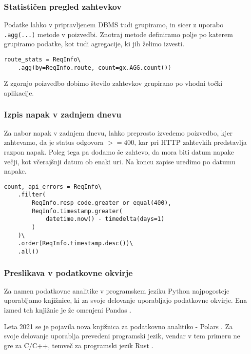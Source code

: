 \documentclass[a4paper,12pt,openright]{book}
\begin{document}
    \newpage
    \subsubsection{Statističen pregled zahtevkov}

    Podatke lahko v pripravljenem DBMS tudi grupiramo, in sicer z uporabo {\tt .agg(...)} metode v poizvedbi. Znotraj metode definiramo polje po katerem grupiramo podatke, kot tudi agregacije, ki jih želimo izvesti.
    
\begin{verbatim}
route_stats = ReqInfo\
    .agg(by=ReqInfo.route, count=gx.AGG.count())
\end{verbatim}

    \noindent
    Z zgornjo poizvedbo dobimo število zahtevkov grupirano po vhodni točki aplikacije. 

    \subsubsection{Izpis napak v zadnjem dnevu}

    Za nabor napak v zadnjem dnevu, lahko preprosto izvedemo poizvedbo, kjer zahtevamo, da je status odgovora $>= 400$, kar pri HTTP zahtevkih predstavlja razpon napak. Poleg tega pa dodamo še zahtevo, da mora biti datum napake večji, kot včerajšnji datum ob enaki uri. Na koncu zapise uredimo po datumu napake.
    
\begin{verbatim}
count, api_errors = ReqInfo\
    .filter(
        ReqInfo.resp_code.greater_or_equal(400),
        ReqInfo.timestamp.greater(
            datetime.now() - timedelta(days=1)
        )
    )\
    .order(ReqInfo.timestamp.desc())\
    .all()
\end{verbatim}

    \subsubsection{Preslikava v podatkovne okvirje}

    Za namen podatkovne analitike v programskem jeziku Python najpogosteje uporabljamo knjižnice, ki za svoje delovanje uporabljajo podatkovne okvirje. Ena izmed teh knjižnic je že omenjeni Pandas \cite{PANDAS_GITHUB}.
    
    Leta 2021 se je pojavila nova knjižnica za podatkovno analitiko - Polars \cite{POLARS}. Za svoje delovanje uporablja prevedeni programski jezik, vendar v tem primeru ne gre za C/C++, temveč za programski jezik Rust \cite{RUST}.
\end{document}
